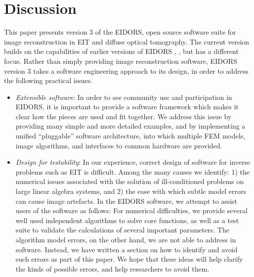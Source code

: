 \documentclass[12pt]{iopart}
\begin{document}
\section{
 Discussion
}

This paper presents version 3 of the EIDORS,
open source software suite for image reconstruction
in EIT and diffuse optical tomography.
The current version builds on the capabilities of
earlier versions of EIDORS \cite{Vauhkonen_etal_2000},
\cite{Polydorides_and_Lionheart_2002}, but
has a different focus. Rather than
simply providing image reconstruction software, 
EIDORS version 3 takes a software engineering
approach to its design, in order to address the
following practical issues.

\begin{itemize}

  \item {\em Extensible software}:
  In order to see community use and participation
  in EIDORS, it is important to provide a 
  software framework which makes it clear how
  the pieces are used and fit together.
  We address this issue by providing many simple
  and more detailed examples, and by implementing
  a unified ``pluggable'' software architecture,
  into which multiple FEM models, image algorithms, and
  interfaces to common hardware are provided.

  \item {\em Design for testability}:
  In our experience, correct design of software for
  inverse problems such as EIT is difficult. Among the
  many causes we identify: 1) the numerical issues associated
  with the solution of ill-conditioned problems on
  large linear algebra systems, and 2) the ease with which
  subtle model errors can cause image artefacts.
  In the EIDORS software, we attempt to assist 
  users of the software as follows:
  For numerical difficulties, we provide several well used independent
  algorithms to solve core functions, as well as a test suite
  to validate the calculations of several important parameters.
  The algorithm model errors, on the other
  hand, we are not able to address in software. Instead, we
  have written a section on how to identify and avoid such
  errors as part of this paper.
  We hope that these ideas will help clarify the kinds of
  possible errors, and help researchers to avoid them.

\end{itemize}
\end{document}

